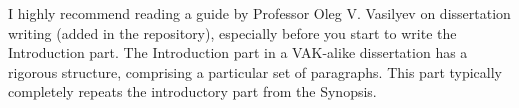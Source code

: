 {\actuality}
I highly recommend reading a guide by Professor Oleg V. Vasilyev on dissertation writing (added in the repository), especially before you start to write the Introduction part. The Introduction part in a VAK-alike dissertation has a rigorous structure, comprising a particular set of paragraphs. This part typically completely repeats the introductory part from the Synopsis. 